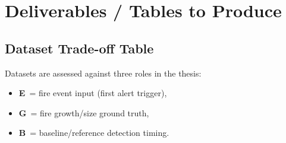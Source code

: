 \documentclass[11pt]{article}
\begin{document}
\section{Deliverables / Tables to Produce}

\subsection{Dataset Trade-off Table}

Datasets are assessed against three roles in the thesis:
\begin{itemize}
    \item \textbf{E}~= fire event input (first alert trigger),
    \item \textbf{G}~= fire growth/size ground truth,
    \item \textbf{B}~= baseline/reference detection timing.
\end{itemize}
\end{document}
